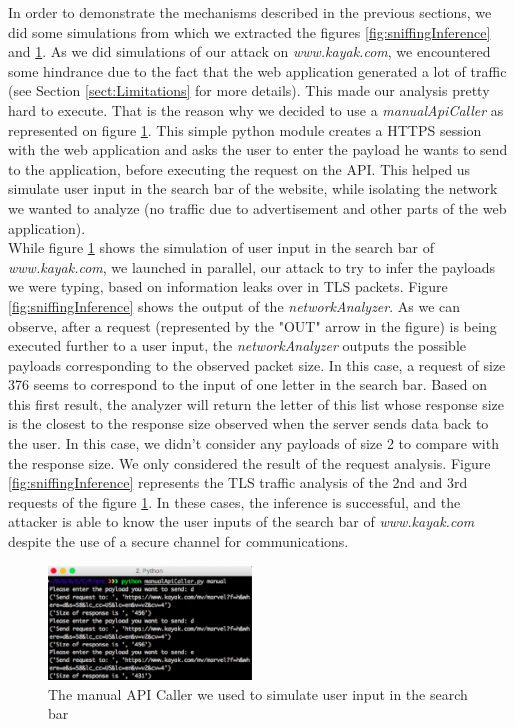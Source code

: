 \documentclass[journal]{IEEEtran}
\begin{document}
In order to demonstrate the mechanisms described in the previous sections, we did some simulations from which we extracted the figures \ref{fig:sniffingInference} and \ref{fig:manualApiCaller}. As we did simulations of our attack on \emph{www.kayak.com}, we encountered some hindrance due to the fact that the web application generated a lot of traffic (see Section \ref{sect:Limitations} for more details). This made our analysis pretty hard to execute. That is the reason why we decided to use a \emph{manualApiCaller} as represented on figure \ref{fig:manualApiCaller}. This simple python module creates a HTTPS session with the web application and asks the user to enter the payload he wants to send to the application, before executing the request on the API. This helped us simulate user input in the search bar of the website, while isolating the network we wanted to analyze (no traffic due to advertisement and other parts of the web application). \\
While figure \ref{fig:manualApiCaller} shows the simulation of user input in the search bar of \emph{www.kayak.com}, we launched in parallel, our attack to try to infer the payloads we were typing, based on information leaks over in TLS packets. Figure \ref{fig:sniffingInference} shows the output of the \emph{networkAnalyzer}. As we can observe, after a request (represented by the "OUT" arrow in the figure) is being executed further to a user input, the \emph{networkAnalyzer} outputs the possible payloads corresponding to the observed packet size. In this case, a request of size 376 seems to correspond to the input of one letter in the search bar. Based on this first result, the analyzer will return the letter of this list whose response size is the closest to the response size observed when the server sends data back to the user. In this case, we didn't consider any payloads of size 2 to compare with the response size. We only considered the result of the request analysis. Figure \ref{fig:sniffingInference} represents the TLS traffic analysis of the 2nd and 3rd requests of the figure \ref{fig:manualApiCaller}. In these cases, the inference is successful, and the attacker is able to know the user inputs of the search bar of \emph{www.kayak.com} despite the use of a secure channel for communications.

\begin{figure}[h]
\centering
\includegraphics[width=0.48\textwidth]{images/manualApiCallerForSniffingTest.png}
\caption{The manual API Caller we used to simulate user input in the search bar}
\label{fig:manualApiCaller}
\end{figure}
\end{document}

